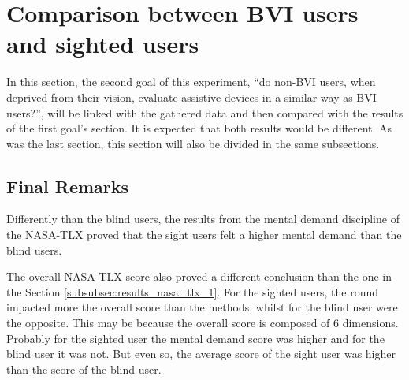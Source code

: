 \section{Comparison between BVI users and sighted users}

In this section, the second goal of this experiment, “do non-BVI users, when deprived from their vision, evaluate assistive devices in a similar way as BVI users?”, will be linked with the gathered data and then compared with the results of the first goal's section. It is expected that both results would be different. As was the last section, this section will also be divided in the same subsections.


 

\subsection{Final Remarks}


% 
%




Differently than the blind users, the results from the mental demand discipline of the NASA-TLX proved that the sight users felt a higher mental demand than the blind users. 

The overall NASA-TLX score also proved a different conclusion than the one in the Section \ref{subsubsec:results_nasa_tlx_1}. For the sighted users, the round impacted more the overall score than the methods, whilst for the blind user were the opposite. This may be because the overall score is composed of 6 dimensions. Probably for the sighted user the mental demand score was higher and for the blind user it was not. But even so, the average score of the sight user was higher than the score of the blind user.

